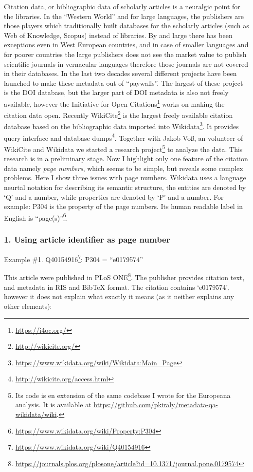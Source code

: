 Citation data, or bibliographic data of scholarly articles is a neuralgic point for the libraries. In the ``Western World'' and for large languages, the publishers are those players which traditionally built databases for the scholarly articles (such as Web of Knowledge, Scopus) instead of libraries. By and large there has been exceptions even in West European countries, and in case of smaller languages and for poorer countries the large publishers does not see the market value to publish scientific journals in vernacular languages therefore those journals are not covered in their databases. In the last two decades several different projects have been launched to make these metadata out of ``paywalls''. The largest of these project is the DOI database, but the larger part of DOI metadata is also not freely available, however the Initiative for Open Citations\footnote{\url{https://i4oc.org/}} works on making the citation data open. Recently WikiCite\footnote{\url{http://wikicite.org/}} is the largest freely available citation database based on the bibliographic data imported into Wikidata\footnote{\url{https://www.wikidata.org/wiki/Wikidata:Main_Page}}. It provides query interface and database dumps\footnote{\url{http://wikicite.org/access.html}}. Together with Jakob Voß, an volunteer of WikiCite and Wikidata we started a research project\footnote{Its code is en extension of the same codebase I wrote for the Europeana analysis. It is available at \url{https://github.com/pkiraly/metadata-qa-wikidata/wiki}.} to analyze the data. This research is in a preliminary stage. Now I highlight only one feature of the citation data namely \emph{page numbers}, which seems to be simple, but reveals some complex problems. Here I show three issues with page numbers. Wikidata uses a language neurtal notation for describing its semantic structure, the entities are denoted by `Q' and a number, while properties are denoted by `P' and a number. For example: P304 is the property of the page numbers. Its human readable label in English is ``page(s)''\footnote{\url{https://www.wikidata.org/wiki/Property:P304}}.

\subsubsection{1. Using article identifier as page number}

Example \#1. Q40154916\footnote{\url{https://www.wikidata.org/wiki/Q40154916}}: P304 = ``e0179574''

This article were published in PLoS ONE\footnote{\url{https://journals.plos.org/plosone/article?id=10.1371/journal.pone.0179574}}. The publisher provides citation text, and metadata in RIS and BibTeX format. The citation contains `e0179574', however it does not explain what exactly it means (as it neither explains any other elements):

